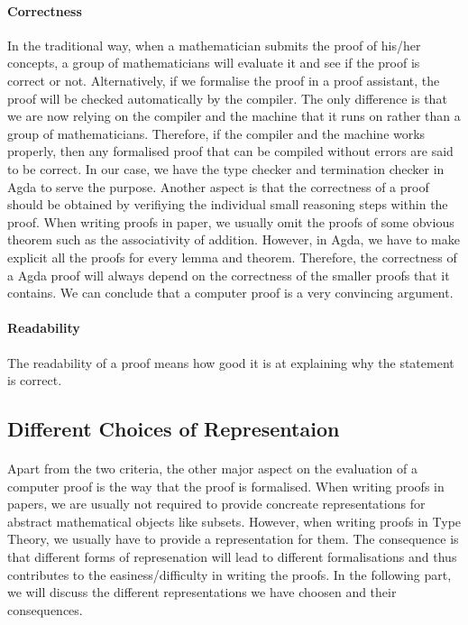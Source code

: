 \documentclass[twoside,openright,final]{bhamthesis}
\begin{document}
\paragraph{Correctness} In the traditional way, when a mathematician
submits the proof of his/her concepts, a group of mathematicians will
evaluate it and see if the proof is correct or not. Alternatively, if we
formalise the proof in a proof assistant, the proof will be checked
automatically by the compiler. The only difference is that we are now
relying on the compiler and the machine that it runs on rather
than a group of mathematicians. Therefore, if the compiler and the
machine works properly, then any formalised proof that
can be compiled without errors are said to be correct. In our case, we
have the type checker and termination checker in Agda to serve the
purpose. Another aspect is that the correctness of a proof should be
obtained by verifiying the individual small reasoning steps within the
proof. When writing proofs in paper, we usually omit the proofs of
some obvious theorem such as the associativity of addition. However,
in Agda, we have to make explicit all the proofs for every lemma and
theorem. Therefore, the correctness of a Agda proof will always depend on the
correctness of the smaller proofs that it contains. We can conclude
that a computer proof is a very convincing argument. 

\paragraph{Readability} The readability of a proof means how good it
is at explaining why the statement is correct. 

\subsection{Different Choices of Representaion}
\paragraph{} Apart from the two criteria, the other major aspect on the evaluation
of a computer proof is the way that the proof is formalised. When
writing proofs in papers, we are usually not required to provide
concreate representations for abstract mathematical objects like
subsets. However, when writing proofs in Type Theory, we usually have to provide a
representation for them. The consequence is that different forms of represenation
will lead to different formalisations and thus contributes to the
easiness/difficulty in writing the proofs. In the following part, we
will discuss the different representations we have choosen and their
consequences. 
\end{document}
